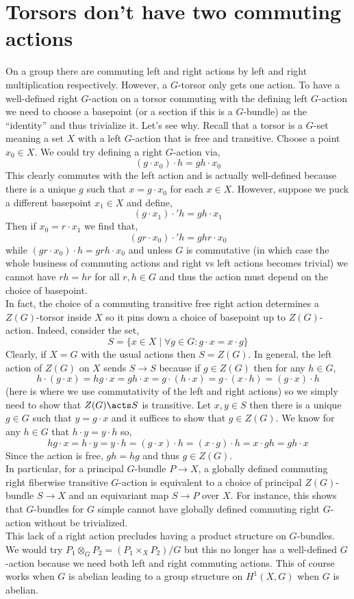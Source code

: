 \documentclass[12pt]{article}
\begin{document}
\section{Torsors don't have two commuting actions}

On a group there are commuting left and right actions by left and right multiplication respectively. However, a $G$-torsor only gets one action. To have a well-defined right $G$-action on a torsor commuting with the defining left $G$-action we need to choose a basepoint (or a section if this is a $G$-bundle) as the ``identity'' and thus trivialize it. Let's see why. Recall that a torsor is a $G$-set meaning a set $X$ with a left $G$-action that is free and transitive. Choose a point $x_0 \in X$. We could try defining a right $G$-action via,
\[ (g \cdot x_0) \cdot h = gh \cdot x_0 \]
This clearly commutes with the left action and is actually well-defined because there is a unique $g$ such that $x = g \cdot x_0$ for each $x \in X$. However, suppose we puck a different basepoint $x_1 \in X$ and define,
\[ (g \cdot x_1) \cdot' h = gh \cdot x_1 \]
Then if $x_0 = r \cdot x_1$ we find that,
\[ (gr \cdot x_0) \cdot' h = ghr \cdot x_0 \]
while $(gr \cdot x_0) \cdot h = grh \cdot x_0$ and unless $G$ is commutative (in which case the whole business of commuting actions and right vs left actions becomes trivial) we cannot have $rh = hr$ for all $r,h \in G$ and thus the action must depend on the choice of basepoint.
\bigskip\\
In fact, the choice of a commuting transitive free right action determines a $Z(G)$-torsor inside $X$ so it pins down a choice of basepoint up to $Z(G)$-action. Indeed, consider the set, 
\[ S = \{ x \in X \mid \forall g \in G : g \cdot x = x \cdot g \} \] Clearly, if $X = G$ with the usual actions then $S = Z(G)$. In general, the left action of $Z(G)$ on $X$ sends $S \to S$ because if $g \in Z(G)$ then for any $h \in G$,
\[ h \cdot (g \cdot x) = hg \cdot x = gh \cdot x = g \cdot (h \cdot x) = g \cdot (x \cdot h) = (g \cdot x) \cdot h \]
(here is where we use commutativity of the left and right actions) so we simply need to show that $Z(G) \acts S$ is transitive. Let $x, y \in S$ then there is a unique $g \in G$ such that $y = g \cdot x$ and it suffices to show that $g \in Z(G)$. We know for any $h \in G$ that $h \cdot y = y \cdot h$ so,
\[ hg \cdot x = h \cdot y = y \cdot h = (g \cdot x) \cdot h = (x \cdot g) \cdot h = x \cdot gh = gh \cdot x \]
Since the action is free, $gh = hg$ and thus $g \in Z(G)$.
\bigskip\\
In particular, for a principal $G$-bundle $P \to X$, a globally defined commuting right fiberwise transitive $G$-action is equivalent to a choice of principal $Z(G)$-bundle $S \to X$ and an equivariant map $S \to P$ over $X$. For instance, this shows that $G$-bundles for $G$ simple cannot have globally defined commuting right $G$-action without be trivialized.
\bigskip\\
This lack of a right action precludes having a product structure on $G$-bundles. We would try $P_1 \otimes_G P_2 = (P_1 \times_X P_2)/G$ but this no longer has a well-defined $G$-action because we need both left and right commuting actions. This of course works when $G$ is abelian leading to a group structure on $H^1(X, G)$ when $G$ is abelian.
\end{document}
